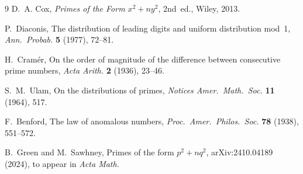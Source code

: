 \documentclass[12pt,a4paper]{article}
\begin{document}
\begin{thebibliography}{9}
D.~A. Cox, \textit{Primes of the Form $x^{2}+ny^{2}$},
2nd~ed., Wiley, 2013.

P.~Diaconis, The distribution of leading digits and uniform
distribution mod~1, \textit{Ann.\ Probab.} \textbf{5} (1977),
72--81.

H.~Cram\'er, On the order of magnitude of the difference
between consecutive prime numbers, \textit{Acta Arith.}
\textbf{2} (1936), 23--46.

S.~M.~Ulam, On the distributions of primes, \textit{Notices
Amer.\ Math.\ Soc.} \textbf{11} (1964), 517.

F.~Benford, The law of anomalous numbers,
\textit{Proc.\ Amer.\ Philos.\ Soc.} \textbf{78} (1938), 551--572.

B.~Green and M.~Sawhney, Primes of the form $p^{2}+nq^{2}$,
arXiv:2410.04189 (2024), to appear in \textit{Acta Math.}
\end{thebibliography}
\end{document}
